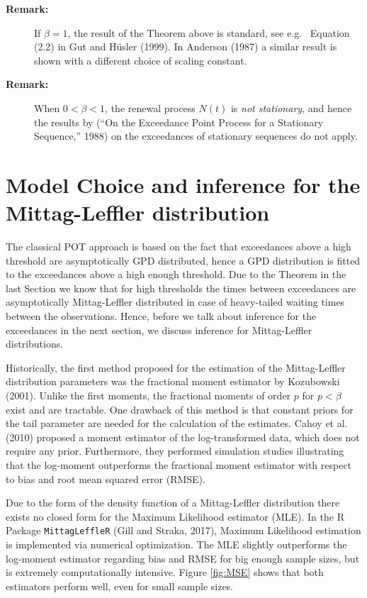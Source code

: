 \documentclass[]{elsarticle} %
\begin{document}
\begin{description}
\item[\textbf{Remark:}]
If \(\beta = 1\), the result of the Theorem above is standard, see e.g.~
Equation (2.2) in Gut and Hüsler (1999). In Anderson (1987) a similar
result is shown with a different choice of scaling constant.
\item[\textbf{Remark:}]
When \(0 < \beta < 1\), the renewal process \(N(t)\) is \emph{not
stationary}, and hence the results by (``On the Exceedance Point Process
for a Stationary Sequence,'' 1988) on the exceedances of stationary
sequences do not apply.
\end{description}

\hypertarget{sec:ML}{%
\section{Model Choice and inference for the Mittag-Leffler
distribution}\label{sec:ML}}

The classical POT approach is based on the fact that exceedances above a
high threshold are asymptotically GPD distributed, hence a GPD
distribution is fitted to the exceedances above a high enough threshold.
Due to the Theorem in the last Section we know that for high thresholds
the times between exceedances are asymptotically Mittag-Leffler
distributed in case of heavy-tailed waiting times between the
observations. Hence, before we talk about inference for the exceedances
in the next section, we discuss inference for Mittag-Leffler
distributions.

Historically, the first method proposed for the estimation of the
Mittag-Leffler distribution parameters was the fractional moment
estimator by Kozubowski (2001). Unlike the first moments, the fractional
moments of order \(p\) for \(p<\beta\) exist and are tractable. One
drawback of this method is that constant priors for the tail parameter
are needed for the calculation of the estimates. Cahoy et al. (2010)
proposed a moment estimator of the log-transformed data, which does not
require any prior. Furthermore, they performed simulation studies
illustrating that the log-moment outperforms the fractional moment
estimator with respect to bias and root mean squared error (RMSE).

Due to the form of the density function of a Mittag-Leffler distribution
there exists no closed form for the Maximum Likelihood estimator (MLE).
In the R Package \texttt{MittagLeffleR} (Gill and Straka, 2017), Maximum
Likelihood estimation is implemented via numerical optimization. The MLE
slightly outperforms the log-moment estimator regarding bias and RMSE
for big enough sample sizes, but is extremely computationally intensive.
Figure \ref{fig:MSE} shows that both estimators perform well, even for
small sample sizes.
\end{document}

